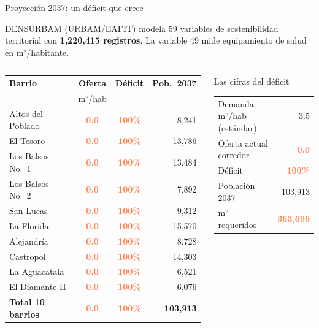 \documentclass[aspectratio=169, 11pt]{beamer}
\newcommand{\danger}[1]{\textcolor{coral}{\textbf{#1}}}
\newcommand{\src}[1]{\par\vspace{2pt}{\tiny\textcolor{slate}{Fuente: #1}}}
\begin{document}
{
\begin{frame}{Proyección 2037: un déficit que crece}

{\small DENSURBAM (URBAM/EAFIT) modela 59 variables de sostenibilidad territorial con \textbf{1,220,415 registros}. La variable 49 mide equipamiento de salud en m²/habitante.}

\vspace{6pt}
\begin{columns}[T]

{\scriptsize
\begin{tabular}{@{}p{3.0cm}ccr@{}}
\toprule
\textbf{Barrio} & \textbf{Oferta} & \textbf{Déficit} & \textbf{Pob.\ 2037} \\
 & {\tiny m²/hab} & & \\
\midrule
\rowcolor{coral!10}
Altos del Poblado & \danger{0.0} & \danger{100\%} & 8,241 \\
\rowcolor{coral!10}
El Tesoro & \danger{0.0} & \danger{100\%} & 13,786 \\
\rowcolor{coral!10}
Los Balsos No.\ 1 & \danger{0.0} & \danger{100\%} & 13,484 \\
\rowcolor{coral!10}
Los Balsos No.\ 2 & \danger{0.0} & \danger{100\%} & 7,892 \\
\rowcolor{coral!8}
San Lucas & \danger{0.0} & \danger{100\%} & 9,312 \\
\rowcolor{coral!8}
La Florida & \danger{0.0} & \danger{100\%} & 15,570 \\
\rowcolor{coral!8}
Alejandría & \danger{0.0} & \danger{100\%} & 8,728 \\
\rowcolor{coral!6}
Castropol & \danger{0.0} & \danger{100\%} & 14,303 \\
\rowcolor{coral!6}
La Aguacatala & \danger{0.0} & \danger{100\%} & 6,521 \\
\rowcolor{coral!6}
El Diamante II & \danger{0.0} & \danger{100\%} & 6,076 \\
\midrule
\textbf{Total 10 barrios} & \danger{0.0} & \danger{100\%} & \textbf{103,913} \\
\bottomrule
\end{tabular}
}

\src{DENSURBAM (densurbam.com.co), 1,220,415 registros, proy.\ 2037}

\begin{alertblock}{\small Las cifras del déficit}
\footnotesize
\begin{tabular}{@{}lr@{}}
Demanda m²/hab (estándar) & 3.5 \\
Oferta actual corredor & \danger{0.0} \\
Déficit & \danger{100\%} \\
\midrule
Población 2037 & 103,913 \\
m² requeridos & \danger{363,696} \\
\end{tabular}
\end{alertblock}


\end{columns}
\end{frame}}
\end{document}
